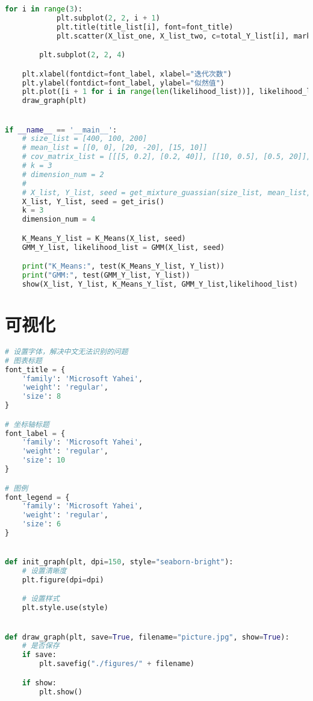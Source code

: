 \documentclass[withoutpreface,bwprint]{cumcmthesis}
\begin{document}
\begin{appendix}
\begin{lstlisting}[language=python]
        for i in range(3):
            plt.subplot(2, 2, i + 1)
            plt.title(title_list[i], font=font_title)
            plt.scatter(X_list_one, X_list_two, c=total_Y_list[i], marker="x")

        plt.subplot(2, 2, 4)

    plt.xlabel(fontdict=font_label, xlabel="迭代次数")
    plt.ylabel(fontdict=font_label, ylabel="似然值")
    plt.plot([i + 1 for i in range(len(likelihood_list))], likelihood_list, linewidth=1)
    draw_graph(plt)


if __name__ == '__main__':
    # size_list = [400, 100, 200]
    # mean_list = [[0, 0], [20, -20], [15, 10]]
    # cov_matrix_list = [[[5, 0.2], [0.2, 40]], [[10, 0.5], [0.5, 20]], [[10, 0.3], [0.3, 15]]]
    # k = 3
    # dimension_num = 2
    #
    # X_list, Y_list, seed = get_mixture_guassian(size_list, mean_list, cov_matrix_list)
    X_list, Y_list, seed = get_iris()
    k = 3
    dimension_num = 4

    K_Means_Y_list = K_Means(X_list, seed)
    GMM_Y_list, likelihood_list = GMM(X_list, seed)

    print("K_Means:", test(K_Means_Y_list, Y_list))
    print("GMM:", test(GMM_Y_list, Y_list))
    show(X_list, Y_list, K_Means_Y_list, GMM_Y_list,likelihood_list)

\end{lstlisting}

\section{可视化}
\begin{lstlisting}[language=python]
# 设置字体，解决中文无法识别的问题
# 图表标题
font_title = {
    'family': 'Microsoft Yahei',
    'weight': 'regular',
    'size': 8
}

# 坐标轴标题
font_label = {
    'family': 'Microsoft Yahei',
    'weight': 'regular',
    'size': 10
}

# 图例
font_legend = {
    'family': 'Microsoft Yahei',
    'weight': 'regular',
    'size': 6
}


def init_graph(plt, dpi=150, style="seaborn-bright"):
    # 设置清晰度
    plt.figure(dpi=dpi)

    # 设置样式
    plt.style.use(style)


def draw_graph(plt, save=True, filename="picture.jpg", show=True):
    # 是否保存
    if save:
        plt.savefig("./figures/" + filename)

    if show:
        plt.show()
\end{lstlisting}
\end{appendix}
\end{document}
